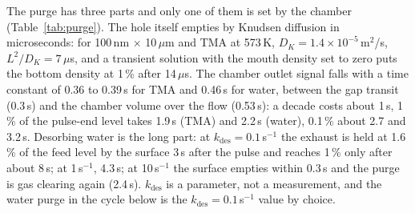 \documentclass[11pt,letterpaper]{article}
\begin{document}
The purge has three parts and only one of them is set by the chamber (Table~\ref{tab:purge}). The hole itself empties by Knudsen diffusion in microseconds: for 100\,nm $\times$ 10\,$\mu$m and TMA at 573\,K, $D_K = 1.4\times10^{-5}$\,m$^2$/s, $L^2/D_K = 7$\,$\mu$s, and a transient solution with the mouth density set to zero puts the bottom density at 1\,\% after 14\,$\mu$s. The chamber outlet signal falls with a time constant of 0.36 to 0.39\,s for TMA and 0.46\,s for water, between the gap transit (0.3\,s) and the chamber volume over the flow (0.53\,s): a decade costs about 1\,s, 1\,\% of the pulse-end level takes 1.9\,s (TMA) and 2.2\,s (water), 0.1\,\% about 2.7 and 3.2\,s. Desorbing water is the long part: at $k_{\mathrm{des}} = 0.1$\,s$^{-1}$ the exhaust is held at 1.6\,\% of the feed level by the surface 3\,s after the pulse and reaches 1\,\% only after about 8\,s; at 1\,s$^{-1}$, 4.3\,s; at 10\,s$^{-1}$ the surface empties within 0.3\,s and the purge is gas clearing again (2.4\,s). $k_{\mathrm{des}}$ is a parameter, not a measurement, and the water purge in the cycle below is the $k_{\mathrm{des}} = 0.1$\,s$^{-1}$ value by choice.
\end{document}
